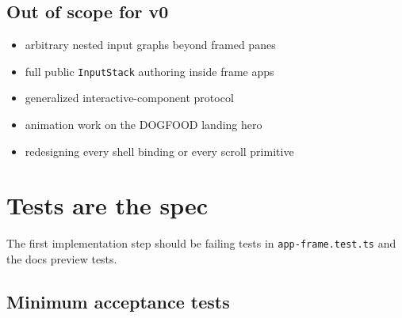 \subsection{Out of scope for v0}\label{record-044-out-of-scope-for-v0}

\begin{itemize}
\tightlist
\item
  arbitrary nested input graphs beyond framed panes
\item
  full public \texttt{I\allowbreak{}n\allowbreak{}p\allowbreak{}u\allowbreak{}t\allowbreak{}S\allowbreak{}t\allowbreak{}a\allowbreak{}c\allowbreak{}k} authoring inside frame apps
\item
  generalized interactive-component protocol
\item
  animation work on the DOGFOOD landing hero
\item
  redesigning every shell binding or every scroll primitive
\end{itemize}

\section{Tests are the spec}\label{record-044-tests-are-the-spec}

The first implementation step should be failing tests in \texttt{a\allowbreak{}p\allowbreak{}p\allowbreak{}-\allowbreak{}f\allowbreak{}r\allowbreak{}a\allowbreak{}m\allowbreak{}e\allowbreak{}.\allowbreak{}t\allowbreak{}e\allowbreak{}s\allowbreak{}t\allowbreak{}.\allowbreak{}t\allowbreak{}s} and the docs preview tests.

\subsection{Minimum acceptance tests}\label{record-044-minimum-acceptance-tests}

